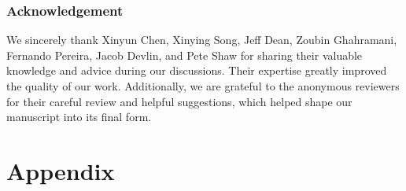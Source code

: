 \documentclass{article}
\begin{document}
\section*{Acknowledgement}
We sincerely thank Xinyun Chen, Xinying Song, Jeff Dean, Zoubin Ghahramani, Fernando Pereira, Jacob Devlin, and Pete Shaw for sharing their valuable knowledge and advice during our discussions. Their expertise greatly improved the quality of our work. Additionally, we are grateful to the anonymous reviewers for their careful review and helpful suggestions, which helped shape our manuscript into its final form.




\clearpage

\part{Appendix} %
\parttoc %

\clearpage





\end{document}
